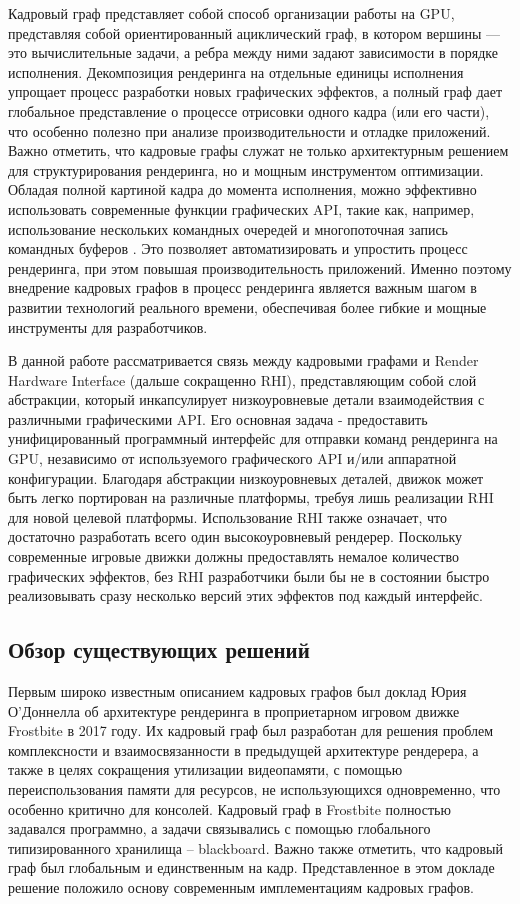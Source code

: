 Кадровый граф представляет собой способ организации работы на GPU, представляя собой ориентированный ациклический граф, в котором вершины — это вычислительные задачи, а ребра между ними задают зависимости в порядке исполнения. Декомпозиция рендеринга на отдельные единицы исполнения упрощает процесс разработки новых графических эффектов, а полный граф дает глобальное представление о процессе отрисовки одного кадра (или его части), что особенно полезно при анализе производительности и отладке приложений. Важно отметить, что кадровые графы служат не только архитектурным решением для структурирования рендеринга, но и мощным инструментом оптимизации. Обладая полной картиной кадра до момента исполнения, можно эффективно использовать современные функции графических API, такие как, например, использование нескольких командных очередей \cite{vulkan_command_queues} и многопоточная запись командных буферов \cite{vulkan_command_buffers}. Это позволяет автоматизировать и упростить процесс рендеринга, при этом повышая производительность приложений. Именно поэтому внедрение кадровых графов в процесс рендеринга является важным шагом в развитии технологий реального времени, обеспечивая более гибкие и мощные инструменты для разработчиков.

В данной работе рассматривается связь между кадровыми графами и Render Hardware Interface (дальше сокращенно RHI), представляющим собой слой абстракции, который инкапсулирует низкоуровневые детали взаимодействия с различными графическими API. Его основная задача - предоставить унифицированный программный интерфейс для отправки команд рендеринга на GPU, независимо от используемого графического API и/или аппаратной конфигурации. Благодаря абстракции низкоуровневых деталей, движок может быть легко портирован на различные платформы, требуя лишь реализации RHI для новой целевой платформы. Использование RHI также означает, что достаточно разработать всего один высокоуровневый рендерер. Поскольку современные игровые движки должны предоставлять немалое количество графических эффектов, без RHI разработчики были бы не в состоянии быстро реализовывать сразу несколько версий этих эффектов под каждый интерфейс.

\subsection{Обзор существующих решений}
Первым широко известным описанием кадровых графов был доклад Юрия О’Доннелла об архитектуре рендеринга в проприетарном игровом движке Frostbite \cite{frame_graph_frostbite} в 2017 году. Их кадровый граф был разработан для решения проблем комплексности и взаимосвязанности в предыдущей архитектуре рендерера, а также в целях сокращения утилизации видеопамяти, с помощью переиспользования памяти для ресурсов, не использующихся одновременно, что особенно критично для консолей. Кадровый граф в Frostbite полностью задавался программно, а задачи связывались с помощью глобального типизированного хранилища -- blackboard. Важно также отметить, что кадровый граф был глобальным и единственным на кадр. Представленное в этом докладе решение положило основу современным имплементациям кадровых графов.

